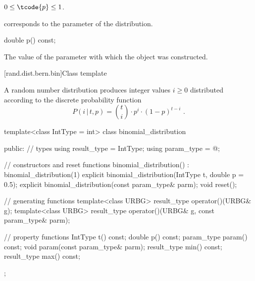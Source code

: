 \begin{itemdescr}
\pnum
\expects
$0 \leq \tcode{p} \leq 1$.

\pnum
\remarks
 corresponds to the parameter of the distribution.
\end{itemdescr}

%
\begin{itemdecl}
double p() const;
\end{itemdecl}

\begin{itemdescr}
\pnum
\returns
The value of the  parameter
 with which the object was constructed.
\end{itemdescr}


[rand.dist.bern.bin]{Class template }%
%
%

\pnum
A  random number distribution
produces integer values $i \geq 0$
distributed according to
the discrete probability function%
%
%
\[ P(i\,|\,t,p) = \binom{t}{i} \cdot p^i \cdot (1-p)^{t-i} \text{ .} \]

%
%
\begin{codeblock}
template<class IntType = int>
  class binomial_distribution {
  public:
    // types
    using result_type = IntType;
    using param_type  = @\unspec@;

    // constructors and reset functions
    binomial_distribution() : binomial_distribution(1) {}
    explicit binomial_distribution(IntType t, double p = 0.5);
    explicit binomial_distribution(const param_type& parm);
    void reset();

    // generating functions
    template<class URBG>
      result_type operator()(URBG& g);
    template<class URBG>
      result_type operator()(URBG& g, const param_type& parm);

    // property functions
    IntType t() const;
    double p() const;
    param_type param() const;
    void param(const param_type& parm);
    result_type min() const;
    result_type max() const;
  };
\end{codeblock}


